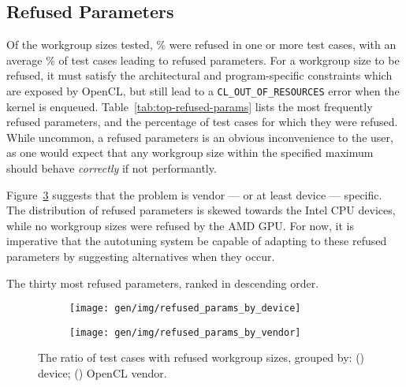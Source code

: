 \subsection{Refused Parameters}

Of the  workgroup sizes tested,
\% were refused in one or more test
cases, with an average \% of test
cases leading to refused parameters. For a workgroup size to be
refused, it must satisfy the architectural and program-specific
constraints which are exposed by OpenCL, but still lead to a
\texttt{CL\_OUT\_OF\_RESOURCES} error when the kernel is
enqueued. Table~\ref{tab:top-refused-params} lists the most frequently
refused parameters, and the percentage of test cases for which they
were refused. While uncommon, a refused parameters is an obvious
inconvenience to the user, as one would expect that any workgroup size
within the specified maximum should behave \emph{correctly} if not
performantly.

Figure~\ref{fig:refused-params-by-dev-vendor} suggests that the
problem is vendor --- or at least device --- specific. The
distribution of refused parameters is skewed towards the Intel CPU
devices, while no workgroup sizes were refused by the AMD
GPU.  For now, it is imperative that the
autotuning system be capable of adapting to these refused parameters
by suggesting alternatives when they occur.

\begin{table}
\parbox{.32\linewidth}{
    \centering
    \scriptsize
    
  }
  \hfill
  \parbox{.32\linewidth}{
    \centering
    \scriptsize
    
  }
  \hfill
  \parbox{.32\linewidth}{
    \centering
    \scriptsize
    
  }
  \caption{The thirty most refused parameters, ranked in descending
    order.}
  \label{tab:top-refused-params}
\end{table}

\begin{figure}
\centering
\begin{subfigure}[h]{.45\textwidth}
  \centering
  \texttt{[image: gen/img/refused\_params\_by\_device]}
  \caption{}
  \label{fig:refused-params-by-device}
\end{subfigure}
\hfill
\begin{subfigure}[h]{.45\textwidth}
  \centering
  \texttt{[image: gen/img/refused\_params\_by\_vendor]}
  \caption{}
  \label{fig:refused-params-by-vendor}
\end{subfigure}
\caption{%
  The ratio of test cases with refused workgroup sizes, grouped by:
  () device;
  () OpenCL vendor.%
}
\label{fig:refused-params-by-dev-vendor}
\end{figure}

